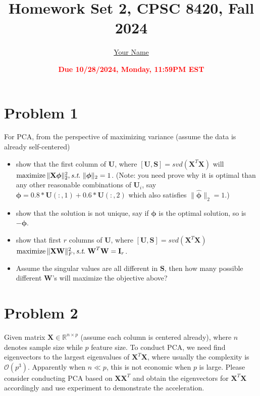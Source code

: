 \documentclass[11pt]{article}
\title{{\bf Homework Set 2, CPSC 8420, Fall 2024}} %
\author{\Large\underline{Your Name}}
\date{\textbf{\Large\textcolor{red}{Due 10/28/2024, Monday, 11:59PM EST}}} %
\newcommand{\R}{\mathbb{R}}
\newcommand{\maximize}{\operatorname*{maximize}}
\newcommand{\mtx}[1]{\mathbf{#1}}
\def \mI {\mtx{I}}
\def \mU {\mtx{U}}
\def \mS {\mtx{S}}
\def \mW {\mtx{W}}
\def \mX {\mtx{X}}
\def \R {\mathbb{R}}
\begin{document}
	\maketitle
	

	\section*{Problem 1}
	For PCA, from the perspective of maximizing variance (assume the data is already self-centered)
	\begin{itemize}
		\item show that the first column of $\mU$, where $[\mU,\mS]=svd(\mX^T\mX)$ will $\maximize \|\mX \bm{\phi}\|^2_2, \st \ \|\bm{\phi}\|_2=1$. (Note: you need prove why it is optimal than any other reasonable combinations of $\mU_i$, say $\hat{\bm{\phi}}=0.8*\mU(:,1)+0.6*\mU(:,2)$ which also  satisfies $\|\hat{\bm{\phi}}\|_2=1$.) 
		\item show that the solution is not unique, say if $\bm{\phi}$ is the optimal solution, so is $-\bm{\phi}$. 
		\item show that first $r$  columns of $\mU$, where $[\mU,\mS]=svd(\mX^T\mX)$ $\maximize \|\mX \bm{\mW}\|^2_F, \st \ \bm{\mW}^T\bm{\mW}=\mI_r$.
		\item Assume the singular values are all different in $\mS$, then how many possible different $\mW$'s will maximize the objective above?
	\end{itemize} 
	


	
\newpage
	\section*{Problem 2}
	Given matrix $\mX\in\R^{n\times p}$ (assume each column is centered already), where $n$ denotes sample size while $p$ feature size. To conduct PCA, we need find eigenvectors to the  largest eigenvalues of $\mX^T\mX$, where usually the complexity is $\mathcal{O}(p^3)$. Apparently when $n\ll p$, this is not economic when $p$ is large. Please consider conducting PCA based on $\mX\mX^T$ and obtain the eigenvectors for $\mX^T\mX$ accordingly and use experiment to demonstrate the acceleration.
		\newpage
	
	
	
\end{document}
